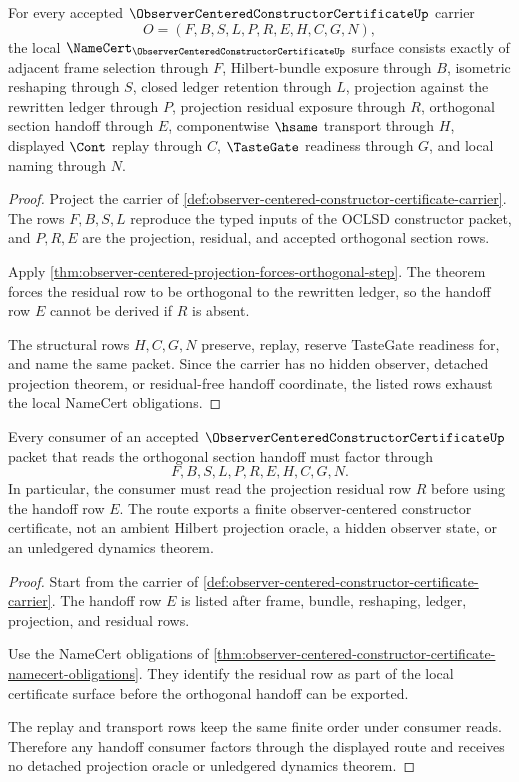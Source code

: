\begin{theorem}
\label{thm:observer-centered-constructor-certificate-namecert-obligations}
For every accepted $\ObserverCenteredConstructorCertificateUp$ carrier
$$
O=(F,B,S,L,P,R,E,H,C,G,N),
$$
the local $\NameCert_{\ObserverCenteredConstructorCertificateUp}$ surface consists exactly of adjacent frame selection through $F$, Hilbert-bundle exposure through $B$, isometric reshaping through $S$, closed ledger retention through $L$, projection against the rewritten ledger through $P$, projection residual exposure through $R$, orthogonal section handoff through $E$, componentwise $\hsame$ transport through $H$, displayed $\Cont$ replay through $C$, $\TasteGate$ readiness through $G$, and local naming through $N$.
\end{theorem}
\begin{proof}
Project the carrier of \autoref{def:observer-centered-constructor-certificate-carrier}. The rows $F,B,S,L$ reproduce the typed inputs of the OCLSD constructor packet, and $P,R,E$ are the projection, residual, and accepted orthogonal section rows.

Apply \autoref{thm:observer-centered-projection-forces-orthogonal-step}. The theorem forces the residual row to be orthogonal to the rewritten ledger, so the handoff row $E$ cannot be derived if $R$ is absent.

The structural rows $H,C,G,N$ preserve, replay, reserve TasteGate readiness for, and name the same packet. Since the carrier has no hidden observer, detached projection theorem, or residual-free handoff coordinate, the listed rows exhaust the local NameCert obligations.
\end{proof}

\begin{theorem}
\label{thm:observer-centered-constructor-certificate-projection-handoff}
Every consumer of an accepted $\ObserverCenteredConstructorCertificateUp$ packet that reads the orthogonal section handoff must factor through
$$
F,B,S,L,P,R,E,H,C,G,N .
$$
In particular, the consumer must read the projection residual row $R$ before using the handoff row $E$. The route exports a finite observer-centered constructor certificate, not an ambient Hilbert projection oracle, a hidden observer state, or an unledgered dynamics theorem.
\end{theorem}
\begin{proof}
Start from the carrier of \autoref{def:observer-centered-constructor-certificate-carrier}. The handoff row $E$ is listed after frame, bundle, reshaping, ledger, projection, and residual rows.

Use the NameCert obligations of \autoref{thm:observer-centered-constructor-certificate-namecert-obligations}. They identify the residual row as part of the local certificate surface before the orthogonal handoff can be exported.

The replay and transport rows keep the same finite order under consumer reads. Therefore any handoff consumer factors through the displayed route and receives no detached projection oracle or unledgered dynamics theorem.
\end{proof}


